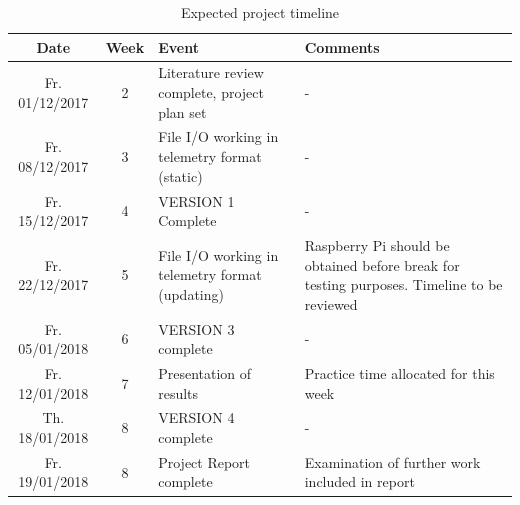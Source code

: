 \documentclass[11pt]{article}
\newenvironment{localsize}[1]
{%
  \clearpage
  \let\orignewcommand\newcommand
  \let\newcommand\renewcommand
  \makeatletter
  \makeatother
  \let\newcommand\orignewcommand
}
{%
  \clearpage
}
\begin{document}
\begin{localsize}{10}

\begin{table}[!h] \centering
 \begin{tabular}{|c c p{5cm} p{4.5cm}|} 
 \hline
 Date & Week & Event & Comments \\ [0.5ex] 
 \hline
 Fr. 01/12/2017 & 2 & Literature review complete, project plan set & - \\
 Fr. 08/12/2017 & 3 & File I/O working in telemetry format (static)  & - \\
 Fr. 15/12/2017 & 4 & VERSION 1 Complete & - \\
 Fr. 22/12/2017 & 5 & File I/O working in telemetry format (updating) & Raspberry Pi should be obtained before break for testing purposes. Timeline to be reviewed \\
 Fr. 05/01/2018 & 6 & VERSION 3 complete & - \\ 
 Fr. 12/01/2018 & 7 & Presentation of results & Practice time allocated for this week \\
 Th. 18/01/2018 & 8 & VERSION 4 complete & - \\
 Fr. 19/01/2018 & 8 & Project Report complete & Examination of further work included in report \\
 \hline
\end{tabular}
\caption{Expected project timeline}
\end{table}

\end{localsize}
\end{document}
